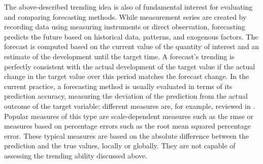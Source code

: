 The above-described trending idea is also of fundamental interest for evaluating and comparing forecasting methods. 
While measurement series are created by recording data using measuring instruments or direct observation, forecasting predicts the future based on historical data, patterns, and exogenous factors. 
The forecast is computed based on the current value of the quantity of interest and an estimate of the development until the target time.
A forecast's trending is perfectly consistent with the actual development of the target value if the actual change in the target value over this period matches the forecast change. 
In the current practice, a forecasting method is usually evaluated in terms of its prediction accuracy, measuring the deviation of the prediction from the actual outcome of the target variable; different measures are, for example, reviewed in \textcite{hyndman2006another}. 
Popular measures of this type are scale-dependent measures such as the \ac{rmse} or measures based on percentage errors such as the root mean squared percentage error. 
These typical measures are based on the absolute difference between the prediction and the true values, locally or globally. 
They are not capable of assessing the trending ability discussed above.

